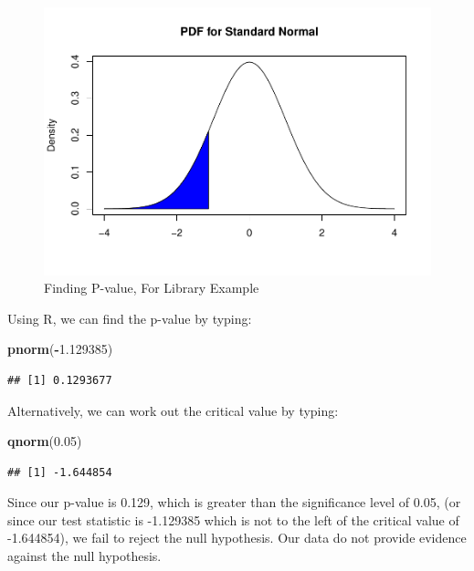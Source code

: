 \documentclass[
]{book}
\newenvironment{Shaded}{\begin{snugshade}}{\end{snugshade}}
\newcommand{\FloatTok}[1]{\textcolor[rgb]{0.00,0.00,0.81}{#1}}
\newcommand{\FunctionTok}[1]{\textcolor[rgb]{0.13,0.29,0.53}{\textbf{#1}}}
\newcommand{\NormalTok}[1]{#1}
\newcommand{\SpecialCharTok}[1]{\textcolor[rgb]{0.81,0.36,0.00}{\textbf{#1}}}
\begin{document}
\begin{figure}
\centering
\includegraphics{bookdown-demo_files/figure-latex/9-pvalworked2-1.pdf}
\caption{\label{fig:9-pvalworked2}Finding P-value, For Library Example}
\end{figure}

Using R, we can find the p-value by typing:

\begin{Shaded}
\begin{Highlighting}[]
\FunctionTok{pnorm}\NormalTok{(}\SpecialCharTok{{-}}\FloatTok{1.129385}\NormalTok{)}
\end{Highlighting}
\end{Shaded}

\begin{verbatim}
## [1] 0.1293677
\end{verbatim}

Alternatively, we can work out the critical value by typing:

\begin{Shaded}
\begin{Highlighting}[]
\FunctionTok{qnorm}\NormalTok{(}\FloatTok{0.05}\NormalTok{)}
\end{Highlighting}
\end{Shaded}

\begin{verbatim}
## [1] -1.644854
\end{verbatim}

Since our p-value is 0.129, which is greater than the significance level of 0.05, (or since our test statistic is -1.129385 which is not to the left of the critical value of -1.644854), we fail to reject the null hypothesis. Our data do not provide evidence against the null hypothesis.
\end{document}
